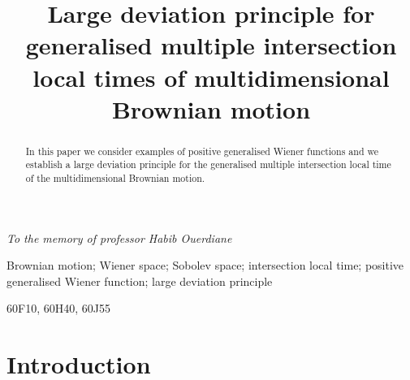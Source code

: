 \documentclass[]{interact}
\newcommand{\1}{\mathbf{1}}
\theoremstyle{plain}%
\theoremstyle{definition}
\theoremstyle{remark}
\begin{document}
\title{Large deviation principle for generalised multiple intersection local times of multidimensional Brownian motion}

\author{
}

\maketitle
\begin{center}
\textit{To the memory of professor Habib Ouerdiane}
\end{center}
\begin{abstract}
In this paper we consider examples of positive generalised Wiener functions and we establish a large deviation principle for the generalised multiple intersection local time of the multidimensional Brownian motion.
\end{abstract}

\begin{keywords}
 Brownian motion; Wiener space; Sobolev space; intersection local time; positive generalised Wiener function; large deviation principle
\end{keywords}

\begin{amscode}
60F10, 60H40, 60J55
\end{amscode}

\section{Introduction}
\end{document}

